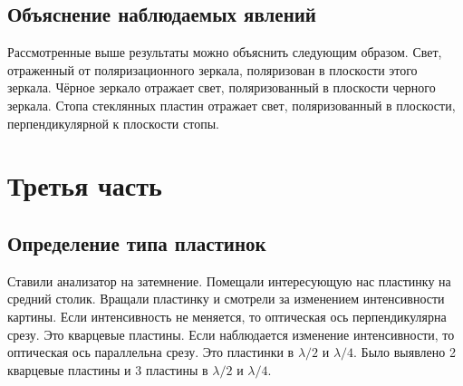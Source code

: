\documentclass[12pt]{article}
\begin{document}
	\subsection{Объяснение наблюдаемых явлений}
	Рассмотренные выше результаты можно объяснить следующим образом. Свет, отраженный от поляризационного зеркала, поляризован в плоскости этого зеркала. Чёрное зеркало отражает свет, поляризованный в плоскости черного зеркала. Стопа стеклянных пластин отражает свет, поляризованный в плоскости, перпендикулярной к плоскости стопы.

	\section{Третья часть}
	\subsection{Определение типа пластинок}
	Ставили анализатор на затемнение. Помещали интересующую нас пластинку на средний столик. Вращали пластинку и смотрели за изменением интенсивности картины. Если интенсивность не меняется, то оптическая ось перпендикулярна срезу. Это кварцевые пластины. Если наблюдается изменение интенсивности, то оптическая ось параллельна срезу. Это пластинки в $\lambda/2$ и $\lambda/4$. Было выявлено 2 кварцевые пластины и 3 пластины в $\lambda/2$ и $\lambda/4$.
\end{document}
